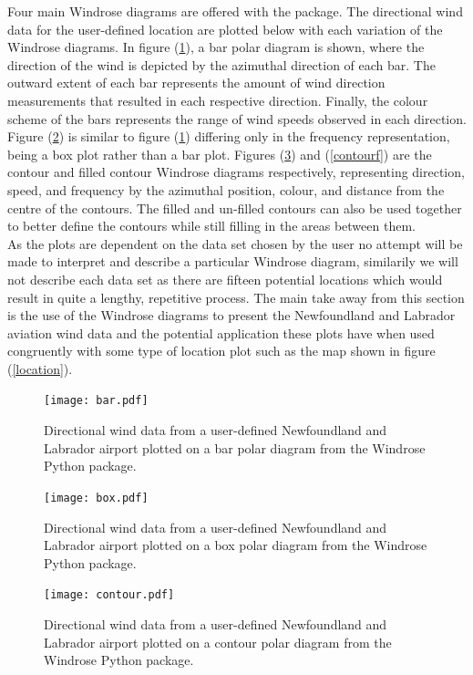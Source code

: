 \documentclass{article}
\begin{document}
\indent Four main Windrose diagrams are offered with the package. The directional wind data for the user-defined location are plotted below with each variation of the Windrose diagrams. In figure 
(\ref{bar}), a bar polar diagram is shown, where the direction of the wind is depicted by the azimuthal direction of each bar. The outward extent of each bar represents the amount of wind direction 
measurements that resulted in each respective direction. Finally, the colour scheme of the bars represents the range of wind speeds observed in each direction. Figure (\ref{box}) is similar to figure 
(\ref{bar}) differing only in the frequency representation, being a box plot rather than a bar plot. Figures (\ref{contour}) and (\ref{contourf}) are the contour and filled contour Windrose diagrams 
respectively, representing direction, speed, and frequency by the azimuthal position, colour, and distance from the centre of the contours. The filled and un-filled contours can also be used together to 
better define the contours while still filling in the areas between them.
\\
\indent As the plots are dependent on the data set chosen by the user no attempt will be made to interpret and describe a particular Windrose diagram, similarily we will not describe each data set as 
there are fifteen potential locations which would result in quite a lengthy, repetitive process. The main take away from this section is the use of the Windrose diagrams to present the Newfoundland and 
Labrador aviation wind data and the potential application these plots have when used congruently with some type of location plot such as the map shown in figure (\ref{location}).
   
\begin{figure}[h!]
\centering
\texttt{[image: bar.pdf]}
\caption{Directional wind data from a user-defined Newfoundland and Labrador airport plotted on a bar polar diagram from the Windrose Python package.}
\label{bar}
\end{figure}

\begin{figure}[h!]
\centering
\texttt{[image: box.pdf]}
\caption{Directional wind data from a user-defined Newfoundland and Labrador airport plotted on a box polar diagram from the Windrose Python package.}
\label{box}
\end{figure}

\begin{figure}[h!]
\centering
\texttt{[image: contour.pdf]}
\caption{Directional wind data from a user-defined Newfoundland and Labrador airport plotted on a contour polar diagram from the Windrose Python package.}
\label{contour}
\end{figure}
\end{document}
